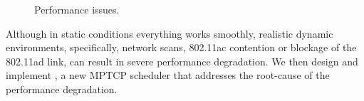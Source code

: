 \begin{figure*}[t]
    \centering
    \hfill
    \hfill
    \vspace{-0.15in}
    \caption{Performance issues.}
    \vspace{-0.1in}
\end{figure*}
\fi
\begin{comment}
\begin{figure}[t]
    \centering
    \subfigure[\emph{minRTT} vs. \emph{FixedRatio}.] {
        \texttt{[image: contention/barplot.pdf]}
        \label{fig:contention_barplot}
    }\hfill
    \subfigure[802.11ad Blockage: Improved recovery time.] {
        \texttt{[image: blockage/blockage\_fixed.pdf]}
        \label{fig:blockage_recovery}
    }
    \vspace{-0.2in}
    \caption{\name evaluation.}
    \vspace{-0.2in}
\end{figure}
\end{comment}
Although in static conditions everything works smoothly, realistic dynamic environments, specifically, network scans, 802.11ac contention or 
blockage of the 802.11ad link, 
can result in severe performance degradation. We then design and implement \name, a new
MPTCP scheduler that addresses the root-cause of the performance
degradation.

